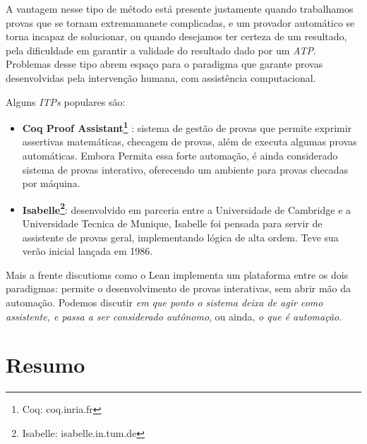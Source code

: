 A vantagem nesse tipo de método está presente justamente quando trabalhamos provas que se tornam extremamanete complicadas, e um provador automático se torna incapaz de solucionar, ou quando desejamos ter certeza de um resultado, pela dificuldade em garantir a validade do resultado dado por um \textit{ATP}.
Problemas desse tipo abrem espaço para o paradigma que garante provas desenvolvidas pela intervenção humana, com assistência computacional.

Alguns \textit{ITPs} populares são:
\begin{itemize}
    \item \textbf{Coq Proof Assistant\footnote{Coq: coq.inria.fr}} : sistema de gestão de provas que permite exprimir assertivas matemáticas, checagem de provas, além de executa algumas provas automáticas. Embora Permita essa forte automação, é ainda considerado sistema de provas interativo, oferecendo um ambiente para provas checadas por máquina.

    \item \textbf{Isabelle\footnote{Isabelle: isabelle.in.tum.de}}: desenvolvido em parceria entre a Universidade de Cambridge e a Universidade Tecnica de Munique, Isabelle foi pensada para servir de assistente de provas geral, implementando lógica de alta ordem. Teve sua verão inicial lançada em 1986.
\end{itemize}

Mais a frente discutioms como o Lean implementa um plataforma entre os dois paradigmas: permite o desenvolvimento de provas interativas, sem abrir mão da automação.
Podemos discutir \textit{em que ponto o sistema deixa de agir como assistente, e passa a ser considerado autônomo}, ou ainda, \textit{o que é automação}.


\section{Resumo}
